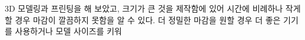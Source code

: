 \documentclass[a4paper, 10pt, nanum]{CSUniSchoolLabReport}
\begin{document}
	3D 모델링과 프린팅을 해 보았고, 크기가 큰 것을 제작함에 있어 시간에 비례하나 작게할 경우 마감이 깔끔하지 못함을 알 수 있다. 더 정밀한 마감을 원할 경우 더 좋은 기기를 사용하거나 모델 사이즈를 키워 



\end{document}
